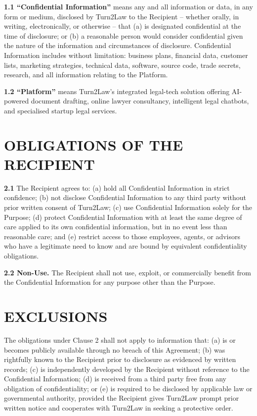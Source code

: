 \documentclass[10pt]{article}
\begin{document}
\textbf{1.1 ``Confidential Information''} means any and all information or data, in any form or medium, disclosed by Turn2Law to the Recipient -- whether orally, in writing, electronically, or otherwise -- that (a) is designated confidential at the time of disclosure; or (b) a reasonable person would consider confidential given the nature of the information and circumstances of disclosure. Confidential Information includes without limitation: business plans, financial data, customer lists, marketing strategies, technical data, software, source code, trade secrets, research, and all information relating to the Platform.

\textbf{1.2 ``Platform''} means Turn2Law's integrated legal-tech solution offering AI-powered document drafting, online lawyer consultancy, intelligent legal chatbots, and specialised startup legal services.


\section{OBLIGATIONS OF THE RECIPIENT}

\textbf{2.1} The Recipient agrees to: (a) hold all Confidential Information in strict confidence; (b) not disclose Confidential Information to any third party without prior written consent of Turn2Law; (c) use Confidential Information solely for the Purpose; (d) protect Confidential Information with at least the same degree of care applied to its own confidential information, but in no event less than reasonable care; and (e) restrict access to those employees, agents, or advisors who have a legitimate need to know and are bound by equivalent confidentiality obligations.

\textbf{2.2 Non-Use.} The Recipient shall not use, exploit, or commercially benefit from the Confidential Information for any purpose other than the Purpose.

\section{EXCLUSIONS}

The obligations under Clause 2 shall not apply to information that: (a) is or becomes publicly available through no breach of this Agreement; (b) was rightfully known to the Recipient prior to disclosure as evidenced by written records; (c) is independently developed by the Recipient without reference to the Confidential Information; (d) is received from a third party free from any obligation of confidentiality; or (e) is required to be disclosed by applicable law or governmental authority, provided the Recipient gives Turn2Law prompt prior written notice and cooperates with Turn2Law in seeking a protective order.
\end{document}
